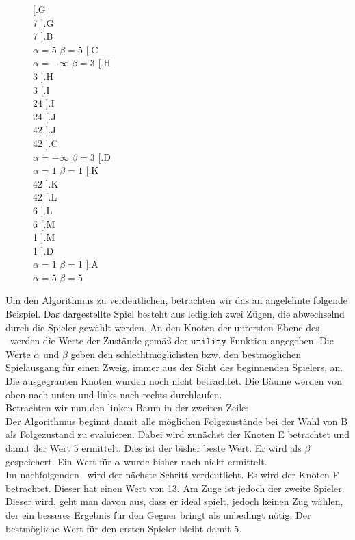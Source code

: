 \begin{figure}[ht!]
{		[.{G\\7} ].{G\\7} 
	].{B\\$\alpha = 5$ $\beta = 5$} 
	[.{C\\$\alpha = -\infty$ $\beta = 3$} 
		[.{H\\3} ].{H\\3}
		[.{I\\\color{grey}24} ].{I\\\color{grey}24}
		[.{J\\\color{grey}42} ].{J\\\color{grey}42} 
	].{C\\$\alpha = -\infty$ $\beta = 3$}
	[.{D\\$\alpha = 1$ $\beta = 1$} 
		[.{K\\42} ].{K\\42}
		[.{L\\6} ].{L\\6}
		[.{M\\1} ].{M\\1} 
	].{D\\$\alpha = 1$ $\beta = 1$}  
].{A\\$\alpha = 5$ $\beta = 5$}
}
\end{figure}
Um den Algorithmus zu verdeutlichen, betrachten wir das an \cite{Russell.2016} angelehnte folgende Beispiel. Das dargestellte Spiel besteht aus lediglich zwei Zügen, die abwechselnd durch die Spieler gewählt werden. An den Knoten der untersten Ebene des \gtrees\ werden die Werte der Zustände gemäß der $\mathtt{utility}$ Funktion angegeben. Die Werte $\alpha$ und $\beta$ geben den schlechtmöglichsten bzw. den bestmöglichen Spielausgang für einen Zweig, immer aus der Sicht des beginnenden Spielers, an. Die ausgegrauten Knoten wurden noch nicht betrachtet. Die Bäume werden von oben nach unten und links nach rechts durchlaufen.\\
Betrachten wir nun den linken Baum in der zweiten Zeile: 
\\Der Algorithmus beginnt damit alle möglichen Folgezustände bei der Wahl von B als Folgezustand zu evaluieren. Dabei wird zunächst der Knoten E betrachtet und damit der Wert 5 ermittelt. Dies ist der bisher beste Wert. Er wird als $\beta$ gespeichert. Ein Wert für $\alpha$ wurde bisher noch nicht ermittelt. \\
Im nachfolgenden \gtree\ wird der nächste Schritt verdeutlicht. Es wird der Knoten F betrachtet. Dieser hat einen Wert von 13. Am Zuge ist jedoch der zweite Spieler. Dieser wird, geht man davon aus, dass er ideal spielt, jedoch keinen Zug wählen, der ein besseres Ergebnis für den Gegner bringt als unbedingt nötig. Der bestmögliche Wert für den ersten Spieler bleibt damit 5.
